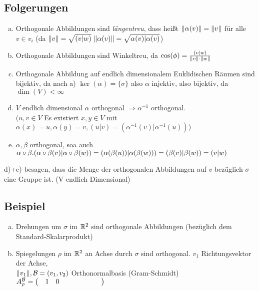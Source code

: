 \subsection{Folgerungen}
\begin{enumerate}[a)]
\item Orthogonale Abbildungen sind \emph{längentreu}, dass hei\ss t $\Vert\alpha(v)\Vert = \Vert v\Vert$ für alle $v \in v_i$ (da $\Vert v\Vert = \sqrt{(v|w)}\ \Vert\alpha(v) \Vert = \sqrt{\alpha(v)| \alpha(v)} $)
\item Orthogonale Abbildungen sind Winkeltreu, da $\cos(\phi) = \frac{(v|w)}{\Vert v\Vert \cdot \Vert w\Vert}$
\item Orthogonale Abbildung auf endlich dimensionalem Euklidischen Räumen sind bijektiv, da nach a) $\ker(\alpha) = \{\sigma\}$ also $\alpha$ injektiv, also bijektiv, da $\dim(V) < \infty$
\item $V$ endlich dimensional $\alpha$ orthogonal $\Rightarrow \alpha^{-1}$ orthogonal.\\
$(u,v \in V$ Es existiert $x,y \in V$ mit $\alpha(x)  = u, \alpha(y) = v, (u|v) = (\alpha^{-1}(v)| \alpha^{-1}(u)))$
\item $\alpha,\beta$ orthogonal, soa auch $\alpha \circ \beta.\\
(\alpha \circ \beta(v) | \alpha \circ \beta(w)) = (\alpha(\beta (u))|\alpha(\beta(w))) = (\beta(v)|\beta(w)) = (v|w)$
\end{enumerate}
d)+e) besagen, dass die Menge der orthogonalen Abbildungen auf $v$ bezüglich $\sigma$ eine Gruppe ist. (V endlich Dimensional)
\subsection{Beispiel}
\begin{enumerate}[a)]
\item Drehungen um $\sigma$ im $\mathbb{R}^2$ sind orthogonale Abbildungen (bezüglich dem Standard-Skalarprodukt)
\item Spiegelungen $\rho$ im $\mathbb{R}^2$ an Achse durch $\sigma$ sind orthogonal. $v_1$ Richtungsvektor der Achse,\\
$\Vert v_1\Vert, \mathcal{B} = (v_1,v_2)$ Orthonormalbasis (Gram-Schmidt)\\
$A^{\mathcal{B}}_\rho = \Matrix{1,0;0,-1}$
\end{enumerate}
